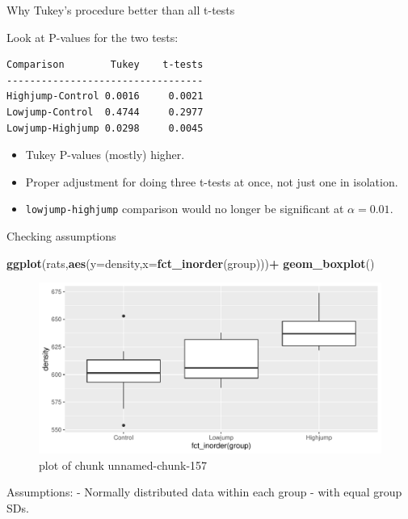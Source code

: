 \documentclass[ignorenonframetext,]{beamer}
\newenvironment{Shaded}{\begin{snugshade}}{\end{snugshade}}
\newcommand{\DataTypeTok}[1]{\textcolor[rgb]{0.13,0.29,0.53}{#1}}
\newcommand{\KeywordTok}[1]{\textcolor[rgb]{0.13,0.29,0.53}{\textbf{#1}}}
\newcommand{\NormalTok}[1]{#1}
\newcommand{\OperatorTok}[1]{\textcolor[rgb]{0.81,0.36,0.00}{\textbf{#1}}}
\providecommand{\tightlist}{%
  \setlength{\itemsep}{0pt}\setlength{\parskip}{0pt}}
\begin{document}
\begin{frame}[fragile]{Why Tukey's procedure better than all t-tests}
\protect\hypertarget{why-tukeys-procedure-better-than-all-t-tests}{}

Look at P-values for the two tests:

\begin{verbatim}
Comparison        Tukey    t-tests
----------------------------------
Highjump-Control 0.0016     0.0021
Lowjump-Control  0.4744     0.2977
Lowjump-Highjump 0.0298     0.0045
\end{verbatim}

\begin{itemize}
\tightlist
\item
  Tukey P-values (mostly) higher.
\item
  Proper adjustment for doing three t-tests at once, not just one in
  isolation.
\item
  \texttt{lowjump-highjump} comparison would no longer be significant at
  \(\alpha = 0.01\).
\end{itemize}

\end{frame}

\begin{frame}[fragile]{Checking assumptions}
\protect\hypertarget{checking-assumptions}{}

\begin{Shaded}
\begin{Highlighting}[]
\KeywordTok{ggplot}\NormalTok{(rats,}\KeywordTok{aes}\NormalTok{(}\DataTypeTok{y=}\NormalTok{density,}\DataTypeTok{x=}\KeywordTok{fct_inorder}\NormalTok{(group)))}\OperatorTok{+}
\KeywordTok{geom_boxplot}\NormalTok{()}
\end{Highlighting}
\end{Shaded}

\begin{figure}
\centering
\includegraphics{figure/unnamed-chunk-157-1.pdf}
\caption{plot of chunk unnamed-chunk-157}
\end{figure}

Assumptions: - Normally distributed data within each group - with equal
group SDs.

\end{frame}
\end{document}

